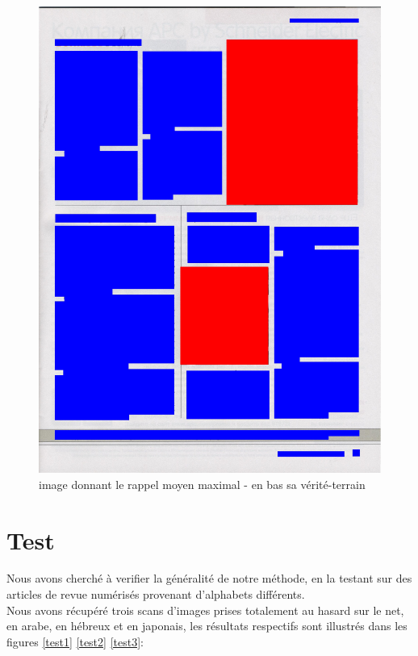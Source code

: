\documentclass{book}
\begin{document}
\begin{figure}[H]
\begin{center}
\includegraphics[scale=0.25]{images/4_m.jpg}
\end{center}
\caption{image donnant le rappel moyen maximal - en bas sa vérité-terrain}
\label{meilleur_rappel}
\end{figure}

\clearpage

\chapter{Test}

Nous avons cherché à verifier la généralité de notre méthode, en la testant sur des articles de revue numérisés provenant d'alphabets
différents.\\
Nous avons récupéré trois scans d'images prises totalement au hasard sur le net, en arabe, en hébreux et en japonais, les résultats
respectifs sont illustrés dans les figures \ref{test1} \ref{test2} \ref{test3}:\\ 
\end{document}
